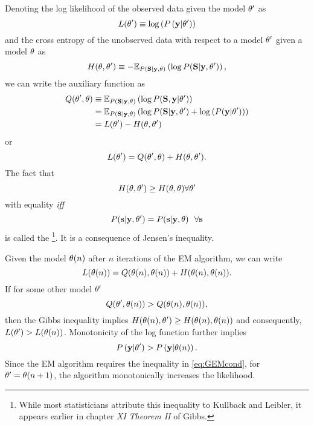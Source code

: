 Denoting the log likelihood of the observed data given the model
$\theta'$ as
\begin{equation*}
  L(\theta') \equiv \log \left( P \left(\mathbf{y}|\theta' \right)\right)
\end{equation*}
and the cross entropy of the unobserved data with respect to a model
$\theta'$ given a model $\theta$ as
\begin{equation*}
  H(\theta, \theta') \equiv - \mathbb{E}_{P
    \left({\bf S}|\mathbf{y},\theta \right)} \left( \log P({\bf S}|\mathbf{y},\theta')
  \right),
\end{equation*}
we can write the auxiliary function as
\begin{align*}
  Q(\theta',\theta) &\equiv \mathbb{E}_{P \left({\bf S}|\mathbf{y} ,\theta\right)}
  \left( \log P({\bf S},\mathbf{y}|\theta') \right)\\
  &= \mathbb{E}_{P \left({\bf S}|\mathbf{y} ,\theta \right)} \left( \log
    P({\bf S}|\mathbf{y},\theta') + \log \left( P(\mathbf{y}|\theta') \right)
  \right)\\
  &= L(\theta') - H(\theta, \theta')
\end{align*}
or
\begin{equation}
  \label{eq:LQH}
   L(\theta') = Q(\theta',\theta) + H(\theta,
   \theta').
\end{equation}
The fact that
\begin{equation}
  \label{eq:GibbsIE}
  H(\theta, \theta') \geq  H(\theta, \theta)
  \forall \theta'
\end{equation}
with equality \emph{iff}
\begin{equation*}
  P({\bf s}|\mathbf{y},\theta') =  P({\bf s}|\mathbf{y},\theta) ~~ \forall {\bf s}
\end{equation*}
is called the \emph{}\footnote{While most
  statisticians attribute this inequality to Kullback and
  Leibler\cite{Kullback51}, it appears earlier in chapter {\em XI}
  {\em Theorem II} of Gibbs\cite{Gibbs}.}.  It is a consequence of
 Jensen's inequality.

Given the model ${\theta}{(n)}$ after $n$ iterations of the EM
algorithm, we can write
\begin{equation}
  L({\theta}{(n)}) = Q({\theta}{(n)}, {\theta}{(n)}) +
  H({\theta}{(n)}, {\theta}{(n)}).
\end{equation}
If for some other model $\theta'$
\begin{equation}
  \label{eq:GEMcond}
  Q(\theta',{\theta}{(n)}) >
  Q({\theta}{(n)},{\theta}{(n)}),
\end{equation}
then the Gibbs inequality implies $H({\theta}{(n)}, \theta') \geq H({\theta}{(n)},
{\theta}{(n)})$ and consequently, $L(\theta') >
L({\theta}{(n)})$.  Monotonicity of the log function further
implies
\begin{equation*}
  P \left(\mathbf{y} |\theta'\right) > P \left(\mathbf{y}|{\theta}{(n)} \right) .
\end{equation*}
Since the EM algorithm requires the inequality in \eqref{eq:GEMcond},
for $\theta' = {\theta}{(n+1)}$, the algorithm
monotonically increases the likelihood.

